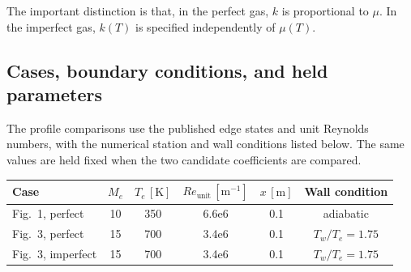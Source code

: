 


The important distinction is that, in the perfect gas, \(k\) is proportional to \(\mu\). In the imperfect gas, \(k(T)\) is specified independently of \(\mu(T)\).

\subsection{Cases, boundary conditions, and held parameters}

The profile comparisons use the published edge states and unit Reynolds numbers, with the numerical station and wall conditions listed below. The same values are held fixed when the two candidate coefficients are compared.

\begin{center}
\small
\begin{tabular}{@{}l
    S[table-format=2.0]
    S[table-format=3.0]
    S[table-format=1.1e1]
    S[table-format=1.1]c@{}}
\toprule
Case & {\(M_e\)} & {\(T_e\,[\mathrm{K}]\)} & {\(Re_{\mathrm{unit}}\,[\mathrm{m^{-1}}]\)} & {\(x\,[\mathrm{m}]\)} & Wall condition \\
\midrule
Fig.~1, perfect & 10 & 350 & 6.6e6 & 0.1 & adiabatic \\
Fig.~3, perfect & 15 & 700 & 3.4e6 & 0.1 & \(T_w/T_e=1.75\) \\
Fig.~3, imperfect & 15 & 700 & 3.4e6 & 0.1 & \(T_w/T_e=1.75\) \\
\bottomrule
\end{tabular}
\end{center}

